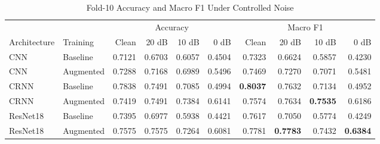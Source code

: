 \begin{table}[t]
  \caption{Fold-10 Accuracy and Macro F1 Under Controlled Noise}
  \label{tab:complete-test-results}
  \centering
  \begin{tabular}{llrrrrrrrr}
    \toprule
    & & \multicolumn{4}{c}{Accuracy} & \multicolumn{4}{c}{Macro F1} \\
    \cmidrule(lr){3-6}\cmidrule(lr){7-10}
    Architecture & Training & Clean & 20 dB & 10 dB & 0 dB
      & Clean & 20 dB & 10 dB & 0 dB \\
    \midrule
    CNN & Baseline
      & 0.7121 & 0.6703 & 0.6057 & 0.4504
      & 0.7323 & 0.6624 & 0.5857 & 0.4230 \\
    CNN & Augmented
      & 0.7288 & 0.7168 & 0.6989 & 0.5496
      & 0.7469 & 0.7270 & 0.7071 & 0.5481 \\
    CRNN & Baseline
      & 0.7838 & 0.7491 & 0.7085 & 0.4994
      & \textbf{0.8037} & 0.7632 & 0.7134 & 0.4952 \\
    CRNN & Augmented
      & 0.7419 & 0.7491 & 0.7384 & 0.6141
      & 0.7574 & 0.7634 & \textbf{0.7535} & 0.6186 \\
    ResNet18 & Baseline
      & 0.7395 & 0.6977 & 0.5938 & 0.4421
      & 0.7617 & 0.7050 & 0.5774 & 0.4249 \\
    ResNet18 & Augmented
      & 0.7575 & 0.7575 & 0.7264 & 0.6081
      & 0.7781 & \textbf{0.7783} & 0.7432 & \textbf{0.6384} \\
    \bottomrule
  \end{tabular}
\end{table}
